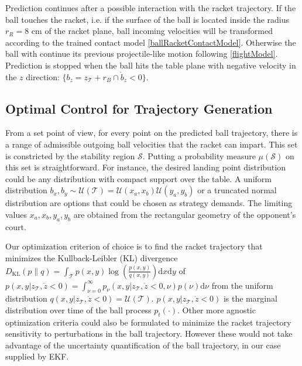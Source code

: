 \documentclass[letterpaper, 10 pt, conference]{ieeeconf}
\newcommand{\ballRadius}{r_B}
\newcommand{\racketRadius}{r_R} %
\newcommand{\stabilityRegion}{\mathcal{S}} %
\newcommand{\court}{\mathcal{T}} %
\newcommand{\hitTime}{\nu} %
\newcommand{\hitDist}{p(\nu)} %
\newcommand{\KL}{D_{\mathrm{KL}}}
\begin{document}
Prediction continues after a possible interaction with the racket trajectory. If the ball touches the racket, i.e. if the surface of the ball is located inside the radius $\racketRadius = 8$ cm of the racket plane, ball incoming velocities will be transformed according to the trained contact model \eqref{ballRacketContactModel}. Otherwise the ball with continue its previous projectile-like motion following \eqref{flightModel}. Prediction is stopped when the ball hits the table plane with negative velocity in the $z$ direction: $\{b_z = z_{\court} + \ballRadius \cap \dot{b}_z < 0\}$.

\subsection{Optimal Control for Trajectory Generation}

From a set point of view, for every point on the predicted ball trajectory, there is a range of admissible outgoing ball velocities that the racket can impart. This set is constricted by the stability region $\stabilityRegion$. 
Putting a probability measure $\mu(\stabilityRegion)$ on this set is straightforward. For instance, the desired landing point distribution could be any distribution with compact support over the table. A uniform distribution $b_x, b_y \sim \mathcal{U}(\court) = \mathcal{U}(x_{a},x_{b})\mathcal{U}(y_{a},y_{b})$ or a truncated normal distribution are options that could be chosen as strategy demands. The limiting values $x_{a},x_{b},y_{a},y_{b}$ are obtained from the rectangular geometry of the opponent's court.
%

Our optimization criterion of choice is to find the racket trajectory that minimizes the Kullback-Leibler (KL) divergence $\KL(p\|q) = \int_{\court}p(x,y)\log(\frac{p(x,y)}{q(x,y)})\textrm{d}x\textrm{d}y$ of $p(x,y|z_{\court},\dot{z} < 0) = \int_{\hitTime = 0}^{\infty} p_{\hitTime}(x,y|z_{\court},\dot{z} < 0,\hitTime)\hitDist \textrm{d}\hitTime$ from the uniform distribution $q(x,y|z_{\court},\dot{z} < 0) = \mathcal{U}(\court)$. $p(x,y|z_{\court},\dot{z} < 0)$ is the marginal distribution over time of the ball process $p_t(\cdot)$. Other more agnostic optimization criteria could also be formulated to minimize the racket trajectory sensitivity to perturbations in the ball trajectory. However these would not take advantage of the uncertainty quantification of the ball trajectory, in our case supplied by EKF.
\end{document}
